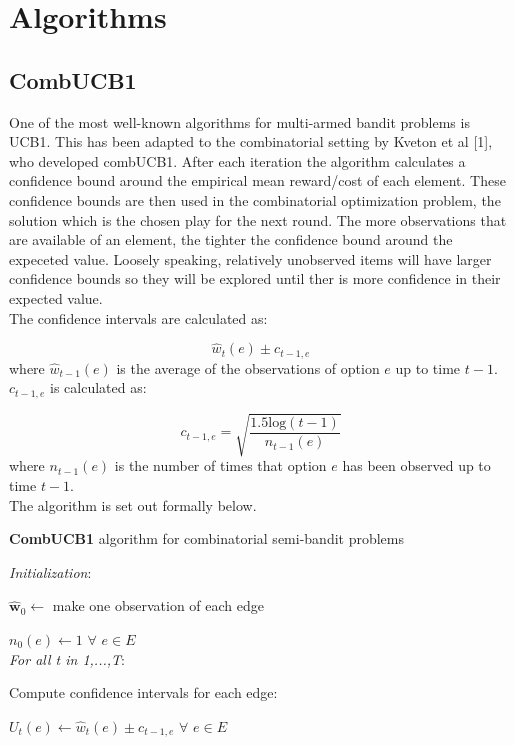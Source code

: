 \section{Algorithms}

\subsection{CombUCB1}

One of the most well-known algorithms for multi-armed bandit problems is UCB1. This has been adapted to the combinatorial setting by Kveton et al [1], who developed combUCB1. After each iteration the algorithm calculates a confidence bound around the empirical mean reward/cost of each element. These confidence bounds are then used in the combinatorial optimization problem, the solution which is the chosen play for the next round. The more observations that are available of an element, the tighter the confidence bound around the expeceted value. Loosely speaking, relatively unobserved items will have larger confidence bounds so they will be explored until ther is more confidence in their expected value.\\

The confidence intervals are calculated as:

$$\hat{w}_t(e)\pm c_{t-1,e}$$ where $\hat{w}_{t-1}(e)$ is the average of the observations of option $e$ up to time $t-1$. $c_{t-1,e}$ is calculated as:

$$c_{t-1,e}=\sqrt{\frac{1.5\textrm{log}(t-1)}{n_{t-1}(e)}}$$ where $n_{t-1}(e)$ is the number of times that option $e$ has been observed up to time $t-1$.\\

The algorithm is set out formally below.

\noindent \hrulefill

\noindent \textbf{CombUCB1} algorithm for combinatorial semi-bandit problems

\noindent \hrulefill

\noindent \textit{Initialization}:

$\mathbf{\hat{w}}_0 \leftarrow$ make one observation of each edge

$n_0(e) \leftarrow 1$ $\forall$ $e \in E$\\

\noindent \textit{For all t in 1,...,T}:

Compute confidence intervals for each edge:

\indent \indent $U_t(e) \leftarrow \hat{w}_t(e)\pm c_{t-1,e}$ $\forall$ $e \in E$\\

